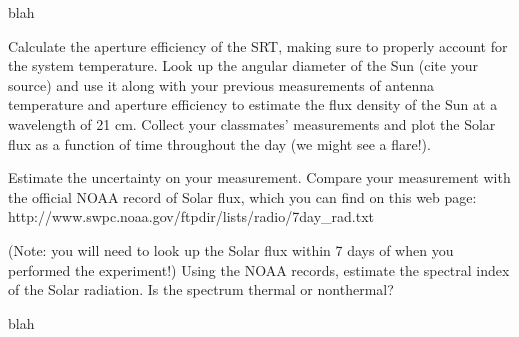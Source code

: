 \documentclass[12pt]{article}
\newenvironment{part}[2][Part]{\begin{trivlist}
\item[\hskip \labelsep {\bfseries #1}\hskip \labelsep {\bfseries #2.}]}{\end{trivlist}}
\newenvironment{writeup}[2][Write-Up]{\begin{trivlist}
\item[\hskip \labelsep {\bfseries #1}\hskip \labelsep {\bfseries #2.}]}{\end{trivlist}}
\begin{document}
\begin{writeup}{1}

 blah
\end{writeup}


\bigskip
\bigskip

\begin{part}{}
  Calculate the aperture efficiency of the SRT, making sure to properly account for the system temperature. Look up the angular diameter of the Sun (cite your source) and use it along with your previous measurements of antenna temperature and aperture efficiency to estimate the flux density of the Sun at a wavelength of 21 cm. Collect your classmates’ measurements and plot the Solar flux as a function of time throughout the day (we might see a flare!).
  \bigskip

  Estimate the uncertainty on your measurement. Compare your measurement with the official NOAA record of Solar flux, which you can find on this web page:
  http://www.swpc.noaa.gov/ftpdir/lists/radio/7day_rad.txt
  \bigskip

  (Note: you will need to look up the Solar flux within 7 days of when you performed the experiment!) Using the NOAA records, estimate the spectral index of the Solar radiation. Is the spectrum thermal or nonthermal?
\end{part}

\begin{writeup}{1}

 blah
\end{writeup}
\end{document}

